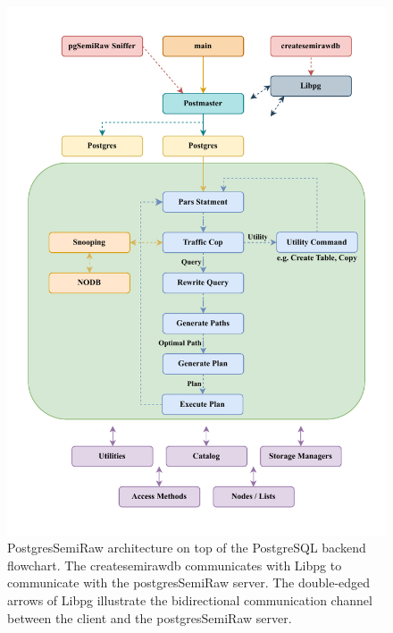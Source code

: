 \begin{figure}[h!]
\centering
\includegraphics[width=1.0\linewidth]{img/pgSemiraw_Flowchart.pdf}
\caption[PostgresSemira architecture on top of the PostgreSQL backend flowchart.]{PostgresSemiRaw architecture on top of the PostgreSQL backend flowchart. The createsemirawdb communicates with Libpg to communicate with the postgresSemiRaw server. The double-edged arrows of Libpg illustrate the bidirectional communication channel between the client and the postgresSemiRaw server.~\cite{noauthor_postgresql_2024}}
\label{fig:pgSemiraw-flowchart}
\end{figure}